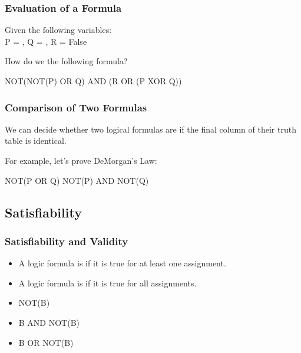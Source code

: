 \documentclass{beamer}
\begin{document}
\begin{frame}
  \frametitle{Evaluation of a Formula}

  Given the following variables:\\ P = , Q = , R = \alert{False}

  \vfill
  
  How do we  the following formula?
  \begin{center}
    NOT(NOT(P) OR Q) AND (R OR (P XOR Q))
  \end{center}
\end{frame}

\begin{frame}
  \frametitle{Comparison of Two Formulas}

  We can decide whether two logical formulas are
   if the final column of their truth table is
  identical.

  \vfill

  For example, let's prove DeMorgan's Law:
  \begin{center}
    NOT(P OR Q)  NOT(P) AND NOT(Q)
  \end{center}
\end{frame}

\subsection{Satisfiability}

\begin{frame}
  \frametitle{Satisfiability and Validity}

  \begin{itemize}
  \item A logic formula is  if it is true for
    \alert{at least one} assignment.
  \item A logic formula is  if it is true for
    \alert{all} assignments.
  \end{itemize}

  \vfill

  \begin{itemize}
  \item {} NOT(B)
  \item {} B AND NOT(B)
  \item {} B OR NOT(B)
  \end{itemize}
\end{frame}
\end{document}
